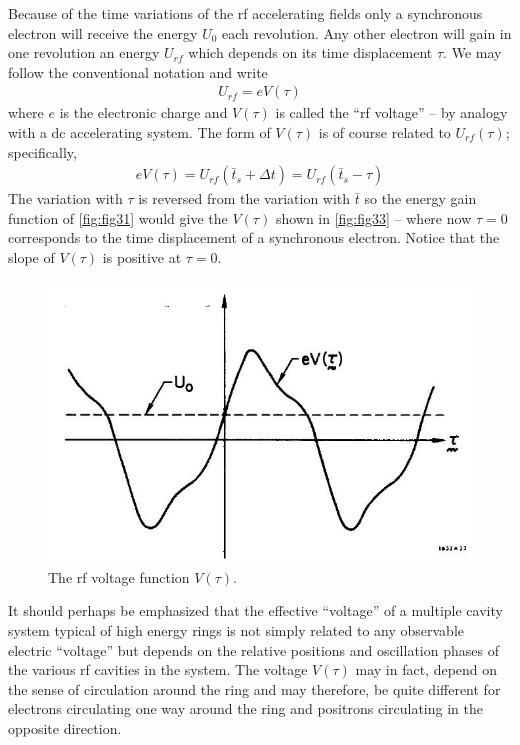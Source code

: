 Because of the time variations of the rf accelerating fields only a synchronous electron will receive the energy $U_0$ each revolution. Any other electron will gain in one revolution an energy $U_{rf}$ which depends on its time displacement $\tau$. We may follow the conventional notation and write
\begin{align}
	U_{rf} = eV(\tau)
\end{align}
where $e$ is the electronic charge and $V(\tau)$ is called the ``rf voltage'' -- by analogy with a dc accelerating system. The form of $V(\tau)$ is of course related to $U_{rf}(\tau)$; specifically,
\begin{align}
	eV(\tau) = U_{rf}(\bar{t}_s + \Delta t) = U_{rf}(\bar{t}_s - \tau)
\end{align}
The variation with $\tau$ is reversed from the variation with $\bar{t}$ so the energy gain function of \autoref{fig:fig31} would give the $V(\tau)$ shown in \autoref{fig:fig33} -- where now $\tau = 0$ corresponds to the time displacement of a synchronous electron. Notice that the slope of $V(\tau)$ is positive at $\tau = 0$.

\begin{figure}[!htb]
	\centering
	\includegraphics[width=0.6\linewidth]{./Figuras/fig33.jpeg}
	\caption{The rf voltage function $V(\tau)$.}
	\label{fig:fig33}
\end{figure}

It should perhaps be emphasized that the effective ``voltage'' of a multiple cavity system typical of high energy rings is not simply related to any observable electric ``voltage'' but depends on the relative positions and oscillation phases of the various rf cavities in the system. The voltage $V(\tau)$ may in fact, depend on the sense of circulation around the ring and may therefore, be quite different for electrons circulating one way around the ring and positrons circulating in the opposite direction.

